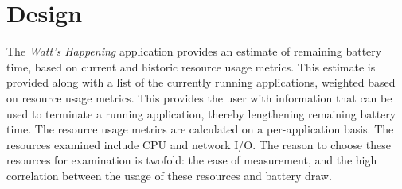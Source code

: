 \section{Design}
\label{sec:design}
% 



% 


The \emph{Watt's Happening} application provides an estimate of remaining battery time, based on current and historic resource usage metrics. 
This estimate is provided along with a list of the currently running applications, weighted based on resource usage metrics.  
This provides the user with information that can be used to terminate a running application, thereby lengthening remaining battery time.
The resource usage metrics are calculated on a per-application basis.
The resources examined include CPU and network I/O.
The reason to choose these resources for examination is twofold: the ease of measurement, and the high correlation between the usage of these resources and battery draw.

